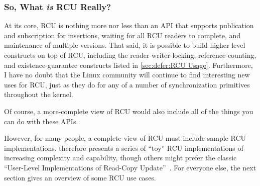 \subsubsection{So, What \emph{is} RCU Really?}
\label{sec:defer:So; What is RCU Really?}

At its core, RCU is nothing more nor less than an API that supports
publication and subscription for insertions, waiting for all RCU readers
to complete, and maintenance of multiple versions.
That said, it is possible to build higher-level constructs
on top of RCU, including the reader-writer-locking, reference-counting,
and existence-guarantee constructs listed in
\cref{sec:defer:RCU Usage}.
Furthermore, I have no doubt that the Linux community will continue to
find interesting new uses for RCU,
just as they do for any of a number of synchronization
primitives throughout the kernel.

Of course, a more-complete view of RCU would also include
all of the things you can do with these APIs.

However, for many people, a complete view of RCU must include sample
RCU implementations.
 therefore presents a series
of ``toy'' RCU implementations of increasing complexity and capability,
though others might prefer the classic
``User-Level Implementations of Read-Copy
Update''~\cite{MathieuDesnoyers2012URCU}.
For everyone else, the next section gives an overview of some RCU use cases.
